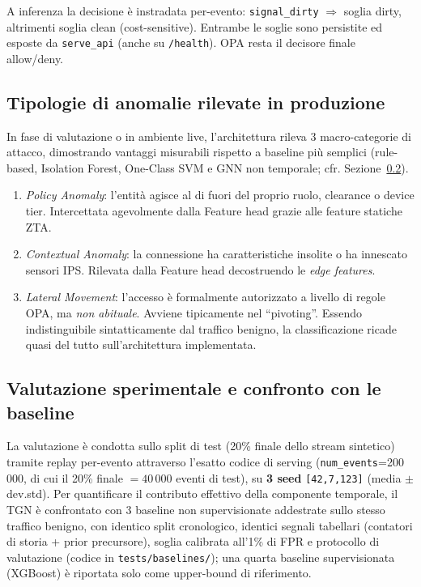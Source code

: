 A inferenza la decisione è instradata per-evento: \texttt{signal\_dirty} $\Rightarrow$ soglia dirty, altrimenti soglia clean (cost-sensitive). Entrambe le soglie sono persistite ed esposte da \texttt{serve\_api} (anche su \texttt{/health}). OPA resta il decisore finale allow/deny.

\subsection{Tipologie di anomalie rilevate in produzione}

In fase di valutazione o in ambiente live, l'architettura rileva 3 macro-categorie di attacco, dimostrando vantaggi misurabili rispetto a baseline più semplici (rule-based, Isolation Forest, One-Class SVM e GNN non temporale; cfr. Sezione~\ref{sec:eval}).

\begin{enumerate}
    \item \textit{Policy Anomaly}: l'entità agisce al di fuori del proprio ruolo, clearance o device tier. Intercettata agevolmente dalla Feature head grazie alle feature statiche ZTA.
    \item \textit{Contextual Anomaly}: la connessione ha caratteristiche insolite o ha innescato sensori IPS. Rilevata dalla Feature head decostruendo le \textit{edge features}.
    \item \textit{Lateral Movement}: l'accesso è formalmente autorizzato a livello di regole OPA, ma \textit{non abituale}. Avviene tipicamente nel ``pivoting''. Essendo indistinguibile sintatticamente dal traffico benigno, la classificazione ricade quasi del tutto sull'architettura implementata.
\end{enumerate}

\subsection{Valutazione sperimentale e confronto con le baseline}
\label{sec:eval}

La valutazione è condotta sullo split di test (20\% finale dello stream sintetico) tramite replay per-evento attraverso l'esatto codice di serving (\texttt{num\_events}=200\,000, di cui il 20\% finale $=40\,000$ eventi di test), su \textbf{3 seed} \texttt{[42,7,123]} (media $\pm$ dev.std). Per quantificare il contributo effettivo della componente temporale, il TGN è confrontato con 3 baseline non supervisionate addestrate sullo stesso traffico benigno, con identico split cronologico, identici segnali tabellari (contatori di storia + prior precursore), soglia calibrata all'1\% di FPR e protocollo di valutazione (codice in \texttt{tests/baselines/}); una quarta baseline supervisionata (XGBoost) è riportata solo come upper-bound di riferimento.

